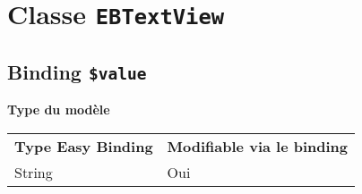 \section{Classe \texttt{EBTextView}}

\subsection{Binding \texttt{\$value}}

{\bf Type du modèle}

\begin{tabular}{ll}
\textbf{Type Easy Binding} & \textbf{Modifiable via le binding}\\
String& Oui\\
\end{tabular}







